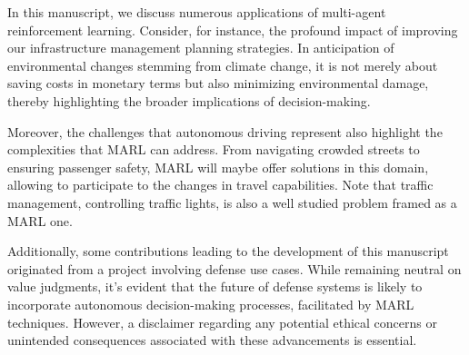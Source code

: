 In this manuscript, we discuss numerous applications of multi-agent reinforcement learning. 
Consider, for instance, the profound impact of improving our infrastructure management planning strategies.
In anticipation of environmental changes stemming from climate change, it is not merely about saving costs in monetary terms but also minimizing environmental damage, thereby highlighting the broader implications of decision-making.

Moreover, the challenges that autonomous driving represent also highlight the complexities that MARL can address.
From navigating crowded streets to ensuring passenger safety, MARL will maybe offer solutions in this domain, allowing to participate to the changes in travel capabilities.
Note that traffic management, controlling traffic lights, is also a well studied problem framed as a MARL one.

Additionally, some contributions leading to the development of this manuscript originated from a project involving defense use cases.
While remaining neutral on value judgments, it's evident that the future of defense systems is likely to incorporate autonomous decision-making processes, facilitated by MARL techniques.
However, a disclaimer regarding any potential ethical concerns or unintended consequences associated with these advancements is essential.

